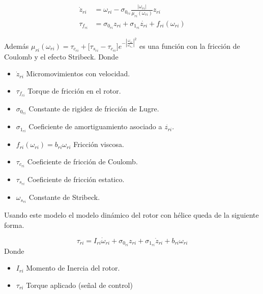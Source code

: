 \documentclass[a4paper]{IEEEtran} %
\begin{document}
\begin{equation}
    \begin{split}
        \dot{z}_{ri}&=\omega_{ri}-\sigma_{0_{ri}}\frac{|\omega_{ri}|}{\mu_{ri}(\omega_{ri})}z_{ri}\\
        \tau_{f_{ri}}&=\sigma_{0_{ri}}z_{ri}+\sigma_{1_{ri}}\dot{z_{ri}}+f_{ri}(\omega_{ri})
    \end{split}
    \label{eq:lugre}
\end{equation}

Además
    $\mu_{ri}(\omega_{ri})=\tau_{c_{ri}}+\lbrack\tau_{s_{ri}}-\tau_{c_{ri}}\rbrack e^{-|\frac{\omega_{ri}}{\omega_{s_{ri}}}|^2}$ es una función con la fricción de Coulomb y el efecto Stribeck. 
Donde
    \begin{itemize}
        \item $\dot{z}_{ri}$ Micromovimientos con velocidad.
        \item $\tau_{f_{ri}}$ Torque de fricción en el rotor.
        \item $\sigma_{0_{ri}}$ Constante de rigidez de fricción de Lugre.
        \item $\sigma_{1_{ri}}$ Coeficiente de amortiguamiento asociado a $\dot{z_{ri}}$.
        \item $f_{ri}(\omega_{ri})=b_{ri}\omega_{ri}$ Fricción viscosa.
        \item $\tau_{c_{ri}}$ Coeficiente de fricción de Coulomb.
        \item $\tau_{s_{ri}}$ Coeficiente de fricción estatico.
        \item $\omega_{s_{ri}}$ Constante de Stribeck. 
    \end{itemize}

Usando este modelo el modelo dinámico del rotor con hélice queda de la siguiente forma.

\begin{equation}
    \tau_{ri}=I_{ri}\dot{\omega}_{ri}+\sigma_{0_{ri}}z_{ri}+\sigma_{1_{ri}}\dot{z}_{ri}+b_{ri}\omega_{ri}
    \label{eq:fric_rotor}
\end{equation}
Donde 
\begin{itemize}
    \item $I_{ri}$ Momento de Inercia del rotor.
    \item $\tau_{ri}$ Torque aplicado (señal de control) 
\end{itemize} 
\end{document}
